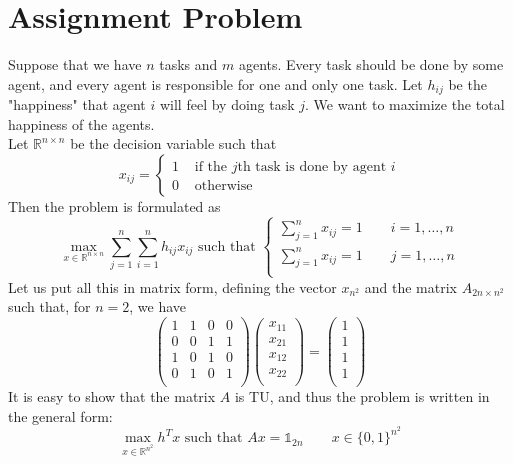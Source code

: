 \documentclass[12pt, openany]{report}
\newcommand{\R}{\mathbb{R}}
\theoremstyle{definition}
\begin{document}
\section{Assignment Problem}
Suppose that we have $n$ tasks and $m$ agents. Every task should be done by some agent, and every agent is responsible for one and only one task. Let $h_{ij}$ be the "happiness" that agent $i$ will feel by doing task $j$. We want to maximize the total happiness of the agents. \\
Let $\R^{n\times n}$ be the decision variable such that 
\begin{equation}
    x_{ij} = \begin{cases}
        1& \text{ if the }j\text{th task is done by agent }i\\
        0& \text{ otherwise}
    \end{cases}
\end{equation}
Then the problem is formulated as 
\begin{equation}
    \max_{x\in \R^{n\times n}} \sum_{j=1}^{n}\sum_{i=1}^n h_{ij}x_{ij}\text{   such that   }\begin{cases}
        \sum_{j=1}^n x_{ij} = 1\qquad i=1, \dots, n\\
        \sum_{j=1}^n x_{ij} = 1\qquad j=1, \dots, n\\
    \end{cases}
\end{equation}
Let us put all this in matrix form, defining the vector $x_{n^2}$ and the matrix $A_{2n\times n^2}$ such that, for \(n=2\), we have
\begin{equation}
    \begin{pmatrix}
        1 & 1 & 0 & 0 \\
        0 & 0 & 1 & 1 \\
        1 & 0 & 1 & 0 \\
        0 & 1 & 0 & 1 \\
    \end{pmatrix}\begin{pmatrix}
        x_{11}\\ x_{21} \\ x_{12} \\ x_{22}\\
    \end{pmatrix} = \begin{pmatrix}
        1\\ 1\\ 1\\ 1\\
    \end{pmatrix}
\end{equation}
It is easy to show that the matrix $A$ is TU, and thus the problem is written in the general form:
\begin{equation}
    \max_{x\in \R^{n^2}} h^Tx \text{   such that   } Ax=\mathbb{1}_{2n}\qquad x\in \{0,1\}^{n^2}
\end{equation}
\end{document}
